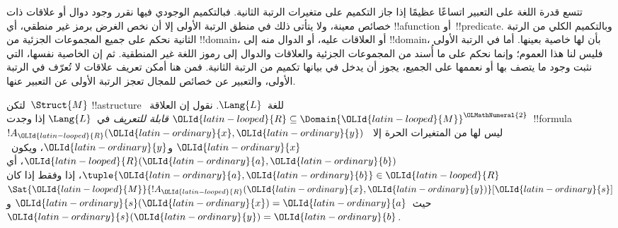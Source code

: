 \documentclass[../../../include/open-logic-section]{subfiles}
\begin{document}

\begin{explain}
تتسع قدرة اللغة على التعبير اتساعًا عظيمًا إذا جاز التكميم على متغيرات
الرتبة الثانية. فبالتكميم الوجودي فيها نقرر وجود دوال أو علاقات ذات
خصائص معينة، ولا يتأتى ذلك في منطق الرتبة الأولى إلا أن نخص الغرض
برمز غير منطقي، أي !!a{function} أو~!!{predicate}.
وبالتكميم الكلي من الرتبة الثانية نحكم على جميع المجموعات الجزئية من
!!{domain}، أو العلاقات عليه، أو الدوال منه إلى !!{domain}،
بأن لها خاصية بعينها. أما في الرتبة الأولى فليس لنا هذا العموم؛
وإنما نحكم على ما أُسند من المجموعات الجزئية والعلاقات والدوال إلى
رموز اللغة غير المنطقية. ثم إن الخاصية نفسها، التي نثبت وجود ما
يتصف بها أو نعممها على الجميع، يجوز أن يدخل في بيانها تكميم من
الرتبة الثانية. فمن هنا أمكن تعريف علاقات لا تُعرّف في الرتبة الأولى،
والتعبير عن خصائص للمجال تعجز الرتبة الأولى عن التعبير عنها.
\end{explain}

\begin{defn}
لتكن~$\Struct{M}$ !!a{structure} للغة~$\Lang{L}$.
نقول إن العلاقة~${\OLId{latin-looped}{R}} \subseteq \Domain{{\OLId{latin-looped}{M}}}^{\OLMathNumeral{2}}$ \emph{قابلة للتعريف}
في~$\Lang{L}$ إذا وجدت~!!{formula}~$!A_{\OLId{latin-looped}{R}}({\OLId{latin-ordinary}{x}}, {\OLId{latin-ordinary}{y}})$ ليس لها من
المتغيرات الحرة إلا~${\OLId{latin-ordinary}{x}}$ و${\OLId{latin-ordinary}{y}}$، ويكون~${\OLId{latin-looped}{R}}({\OLId{latin-ordinary}{a}}, {\OLId{latin-ordinary}{b}})$، أي
$\tuple{{\OLId{latin-ordinary}{a}},{\OLId{latin-ordinary}{b}}} \in {\OLId{latin-looped}{R}}$، إذا وفقط إذا كان
$\Sat{{\OLId{latin-looped}{M}}}{!A_{\OLId{latin-looped}{R}}({\OLId{latin-ordinary}{x}}, {\OLId{latin-ordinary}{y}})}[{\OLId{latin-ordinary}{s}}]$ حيث~${\OLId{latin-ordinary}{s}}({\OLId{latin-ordinary}{x}}) = {\OLId{latin-ordinary}{a}}$ و${\OLId{latin-ordinary}{s}}({\OLId{latin-ordinary}{y}}) = {\OLId{latin-ordinary}{b}}$.
\end{defn}
\end{document}
